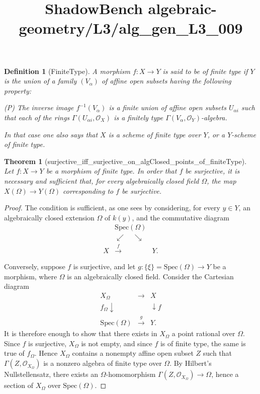 \documentclass{article}
\title{ShadowBench algebraic-geometry/L3/alg\_gen\_L3\_009}
\newtheorem{theorem}{Theorem}
\newtheorem{definition}{Definition}
\begin{document}
\maketitle

\begin{definition}[FiniteType]
A morphism \(f : X \to Y\) is said to be \emph{of finite type} if \(Y\) is the union of a family \((V_\alpha)\) of affine open subsets having the following property:

\medskip

\noindent
(P) The inverse image \(f^{-1}(V_\alpha)\) is a finite union of affine open subsets \(U_{\alpha i}\) such that each of the rings \(\Gamma(U_{\alpha i},\mathcal O_X)\) is a finitely type \(\Gamma(V_\alpha,\mathcal O_Y)\)-algebra.

\medskip

In that case one also says that \(X\) is a scheme of finite type over \(Y\), or a \(Y\)-scheme of finite type.
\end{definition}

\begin{theorem}[surjective_iff_surjective_on_algClosed_points_of_finiteType]
Let \(f:X\to Y\) be a morphism of finite type. In order that \(f\) be surjective, it is necessary and sufficient that, for every algebraically closed field \(\Omega\), the map \(
X(\Omega)\to Y(\Omega)\) corresponding to \(f\) be surjective.
\end{theorem}
\begin{proof}
The condition is sufficient, as one sees by considering, for every \(y\in Y\), an algebraically closed extension \(\Omega\) of \(k(y)\), and the commutative diagram
\[
\begin{array}{ccc}
& \mathrm{Spec}(\Omega) & \\
& \swarrow \quad \searrow & \\
X & \xrightarrow{\ f\ } & Y .
\end{array}
\]

Conversely, suppose \(f\) is surjective, and let \(g:\{\xi\}=\mathrm{Spec}(\Omega)\to Y\) be a morphism, where \(\Omega\) is an algebraically closed field. Consider the Cartesian diagram
\[
\begin{array}{ccc}
X_\Omega & \longrightarrow & X \\
f_\Omega \downarrow  & & \downarrow f \\
\mathrm{Spec}(\Omega) & \xrightarrow{\ g\ } & Y .
\end{array}
\]
It is therefore enough to show that there exists in \(X_\Omega\) a point rational over \(\Omega\). Since \(f\) is surjective, \(X_\Omega\) is not empty, and since \(f\) is of finite type, the same is true of \(f_\Omega\). Hence \(X_\Omega\) contains a nonempty affine open subset \(Z\) such that \(\Gamma(Z,\mathcal O_{X_\Omega})\) is a nonzero algebra of finite type over \(\Omega\). By Hilbert's Nullstellensatz, there exists an \(\Omega\)-homomorphism \(
\Gamma(Z,\mathcal O_{X_\Omega})\to \Omega\), hence a section of \(X_\Omega\) over \(\mathrm{Spec}(\Omega)\). 
\end{proof}
\end{document}
